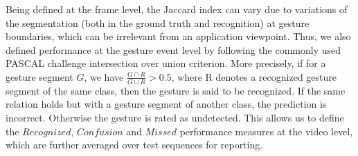 Being defined at the frame level, the Jaccard index can vary due to variations of the segmentation (both in the ground truth and recognition) 
at gesture boundaries, which can be irrelevant from an application viewpoint.
%
Thus, we also defined performance at the gesture event level by following the commonly used PASCAL challenge intersection over union criterion. 
More precisely, if for a gesture segment $G$, we have $\frac{G \cap R}{G \cup R} >  0.5$, where R denotes a recognized gesture 
segment of the same class, then the  gesture is said to be recognized.
%
If the same relation holds but with a gesture segment of another class, the prediction is incorrect.
Otherwise the gesture is rated as undetected. This allows us to define the $Recognized$, $Confusion$ and $Missed$ performance measures at the video level, 
which are further averaged over test sequences for reporting.


